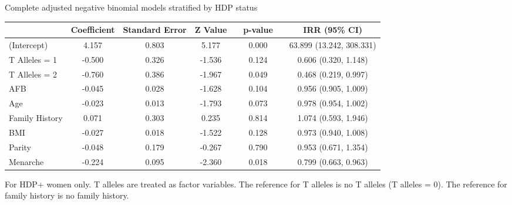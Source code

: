 \documentclass{standalone}
\begin{document}
\begin{threeparttable}
\caption{Complete adjusted negative binomial models stratified by HDP status}
\begin{tabular}{@{}lccccccc@{}}
  \toprule
 & Coefficient & Standard Error & Z Value & \hspace{1em} & p-value & \hspace{1em} & IRR (95\% CI) \\ 
  \midrule
(Intercept) & 4.157 & 0.803 & 5.177 && 0.000 && 63.899 (13.242, 308.331) \\ 
  T Alleles = 1\phantom{hdpxx} & -0.500 & 0.326 & -1.536 && 0.124 && 0.606 (0.320, 1.148) \\ 
  T Alleles = 2 & -0.760 & 0.386 & -1.967 && 0.049 && 0.468 (0.219, 0.997) \\ 
  AFB & -0.045 & 0.028 & -1.628 && 0.104 && 0.956 (0.905, 1.009) \\ 
  Age & -0.023 & 0.013 & -1.793 && 0.073 && 0.978 (0.954, 1.002) \\ 
  Family History & 0.071 & 0.303 & 0.235 && 0.814 && 1.074 (0.593, 1.946) \\ 
  BMI & -0.027 & 0.018 & -1.522 && 0.128 && 0.973 (0.940, 1.008) \\ 
  Parity & -0.048 & 0.179 & -0.267 && 0.790 && 0.953 (0.671, 1.354) \\ 
  Menarche & -0.224 & 0.095 & -2.360 && 0.018 && 0.799 (0.663, 0.963) \\ 
   \bottomrule
\end{tabular}
\begin{tablenotes}
\small
\item For HDP+ women only. T alleles are treated as factor variables. The reference for T alleles is no T alleles (T alleles = 0). The reference for family history is no family history.
\end{tablenotes}
\end{threeparttable}
\end{document}
